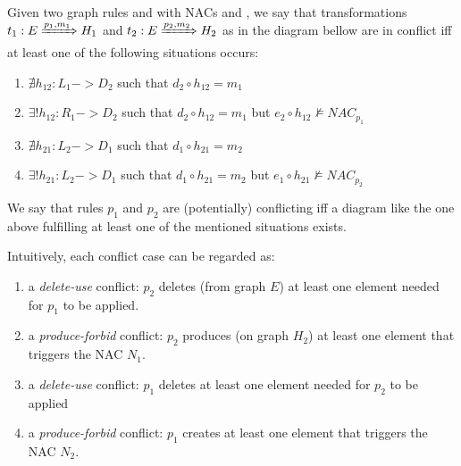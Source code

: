 \begin{definition}[Conflict]\label{def:classic-conflict} Given two graph rules  and  with NACs \nacone{} and \nactwo{}, we say that transformations $t_1: E \xRightarrow{p_1,m_1} H_1$ and $t_2: E \xRightarrow{p_2,m_2} H_2$ as in the diagram bellow are in conflict iff at least one of the following situations occurs:

\begin{enumerate}
    \item $\nexists h_{12} : L_1 -> D_2$ such that $d_2 \circ h_{12} = m_1$
    \item $\exists! h_{12} : R_1 -> D_2$ such that $d_2 \circ h_{12} = m_1$ but $e_2 \circ h_{12} \not\models NAC_{p_1}$
    \item $\nexists h_{21} : L_2 -> D_1$ such that $d_1 \circ h_{21} = m_2$
    \item $\exists! h_{21} : L_2 -> D_1$ such that $d_1 \circ h_{21} = m_2$ but $e_1 \circ h_{21} \not\models NAC_{p_2}$
  \end{enumerate}


We say that rules $p_1$ and $p_2$ are (potentially) conflicting iff a diagram like the one above fulfilling at least one of the mentioned situations exists.
\end{definition}

Intuitively, each conflict case can be regarded as:

\begin{enumerate}
  \item a \emph{delete-use} conflict: $p_2$ deletes (from graph $E$) at least one element needed for $p_1$ to be applied.
  \item a \emph{produce-forbid} conflict: $p_2$ produces (on graph $H_2$) at least one element that triggers the NAC $N_1$.
  \item a \emph{delete-use} conflict: $p_1$ deletes at least one element needed for $p_2$ to be applied
  \item a \emph{produce-forbid} conflict: $p_1$ creates at least one element that triggers the NAC $N_2$.
\end{enumerate}

